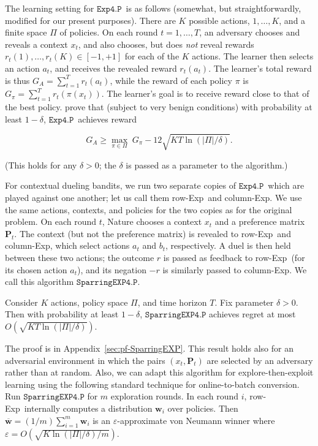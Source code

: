 The learning setting for \ensuremath{\mathtt{Exp4.P}}\ is as follows (somewhat, but straightforwardly, modified for our present purposes). There are $K$ possible actions, $1,\ldots,K$, and a finite space $\Pi$
of policies. On each round $t=1,\ldots,T$, an adversary chooses and reveals a context $x_t$, and also chooses, but does {\em not} reveal rewards
$r_t(1),\ldots,r_t(K)\in [-1,+1]$ for each of the $K$ actions. The learner then selects an action $a_t$, and receives the revealed reward $r_t(a_t)$. The learner's total reward is thus ${G_A} = \sum_{t=1}^T  r_t(a_t)$, while the reward of each policy $\pi$ is
  ${G_{\pi}} = \sum_{t=1}^T  r_t(\pi(x_t))$.
The learner's goal is to receive reward close to that of the best policy. \cite{beygelzimer11:epoch} prove that (subject to very benign conditions) with probability at least $1-\delta$,
\ensuremath{\mathtt{Exp4.P}}\ achieves reward

\begin{equation}  \label{eq:exp4-g1}

    {G_A} \geq \max_{\pi\in\Pi}\; {G_{\pi}} - 12\sqrt{KT \ln({|\Pi|}/\delta)}.
\end{equation}

(This holds for any $\delta>0$; the $\delta$ is passed as a parameter to the algorithm.)

For contextual dueling bandits, we run two separate copies of \ensuremath{\mathtt{Exp4.P}}\ which are played against one another; let us call them
{row-Exp}\ and {column-Exp}. We use the same actions, contexts, and policies for the two copies as for the original problem. On each round $t$, Nature chooses a context $x_t$ and a preference matrix $\mathbf{P}_t$.
The context (but not the preference matrix) is revealed to {row-Exp}\ and {column-Exp}, which select actions $a_t$ and $b_t$, respectively. A duel is then held between these two actions; the outcome $r$ is passed as feedback to {row-Exp}\ (for its chosen action $a_t$), and its negation $-r$ is similarly passed to {column-Exp}. We call this algorithm \ensuremath{\mathtt{SparringEXP4.P}}.

\begin{theorem}
\label{thm:sparring-exp4}
Consider $K$ actions, policy space $\Pi$, and time horizon $T$. Fix parameter $\delta>0$.
Then with probability at least $1-\delta$, \ensuremath{\mathtt{SparringEXP4.P}} achieves regret at most $
    O(\sqrt{KT \ln({|\Pi|}/\delta)})
$.
\end{theorem}

The proof is in Appendix~\ref{sec:pf-SparringEXP}. This result holds also for an adversarial environment in which the pairs $(x_t,\mathbf{P}_t)$ are selected by an adversary rather than at random. Also, we can adapt this algorithm for explore-then-exploit learning using the following standard technique for online-to-batch conversion. Run \ensuremath{\mathtt{SparringEXP4.P}} for $m$ exploration rounds. In each round $i$, {row-Exp}\ internally computes a distribution $\mathbf{w}_i$ over policies. Then ${\overline{\mathbf{w}}} = (1/m) \sum_{i=1}^m \mathbf{w}_i$ is an \ensuremath{\varepsilon}-approximate von Neumann winner where
$\ensuremath{\varepsilon}=O(\sqrt{K\ln({|\Pi|}/\delta)/m})$.

